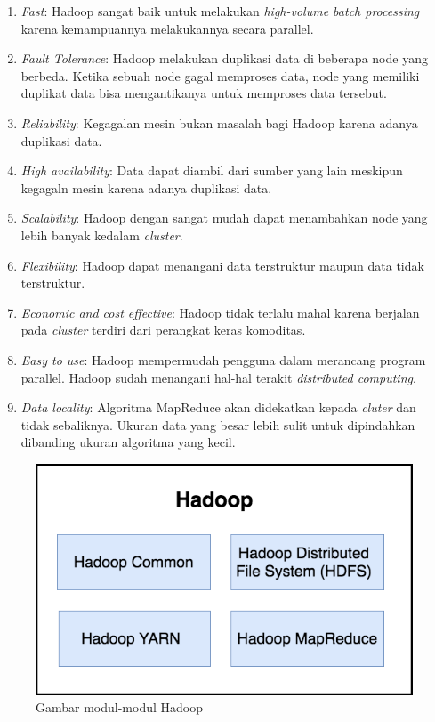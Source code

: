 \documentclass[a4paper,twoside]{article}
\begin{document}
\begin{enumerate}
\begin{enumerate}
\item {\it Fast}: Hadoop sangat baik untuk melakukan {\it high-volume batch processing} karena kemampuannya melakukannya secara parallel.

\item {\it Fault Tolerance}: Hadoop melakukan duplikasi data di beberapa node yang berbeda. Ketika sebuah node gagal memproses data, node yang memiliki duplikat data bisa mengantikanya untuk memproses data tersebut.

\item {\it Reliability}: Kegagalan mesin bukan masalah bagi Hadoop karena adanya duplikasi data.


\item {\it High availability}: Data dapat diambil dari sumber yang lain meskipun kegagaln mesin karena adanya duplikasi data.

\item {\it Scalability}: Hadoop dengan sangat mudah dapat menambahkan node yang lebih banyak kedalam {\it cluster}.

\item {\it Flexibility}: Hadoop dapat menangani data terstruktur maupun data tidak terstruktur. 

\item {\it Economic and cost effective}: Hadoop tidak terlalu mahal karena berjalan pada {\it cluster} terdiri dari perangkat keras komoditas.

\item {\it Easy to use}: Hadoop mempermudah pengguna dalam merancang program parallel. Hadoop sudah menangani hal-hal terakit {\it distributed computing}.

\item {\it Data locality}: Algoritma MapReduce akan didekatkan kepada {\it cluter} dan tidak sebaliknya. Ukuran data yang besar lebih sulit untuk dipindahkan dibanding ukuran algoritma yang kecil.


\end{enumerate}

\begin{figure}[H]
    \centering  
    \includegraphics[scale=0.5]{hmodule}  
    \caption[Gambar modul-modul Hadoop ]{Gambar modul-modul Hadoop} 
    \label{fig:hmodule} 
\end{figure}


\end{enumerate}
\end{document}
